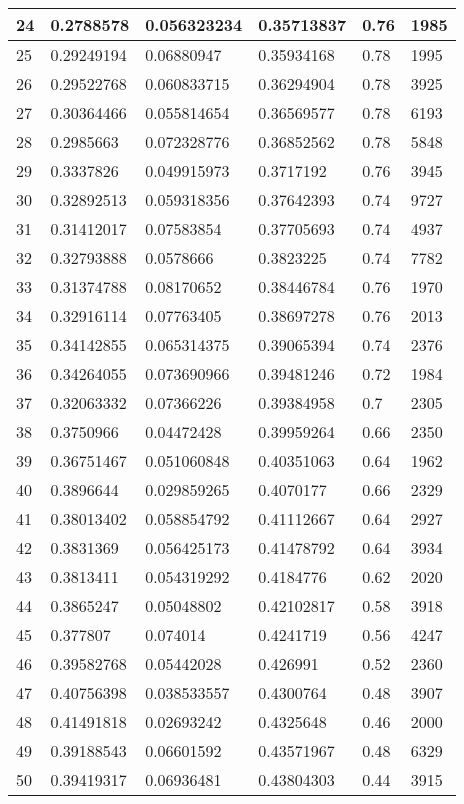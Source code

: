\begin{longtable}{|l|l|l|l|l|l|}
24 & 0.2788578 & 0.056323234 & 0.35713837 & 0.76 & 1985 \\ \hline 
25 & 0.29249194 & 0.06880947 & 0.35934168 & 0.78 & 1995 \\ \hline 
26 & 0.29522768 & 0.060833715 & 0.36294904 & 0.78 & 3925 \\ \hline 
27 & 0.30364466 & 0.055814654 & 0.36569577 & 0.78 & 6193 \\ \hline 
28 & 0.2985663 & 0.072328776 & 0.36852562 & 0.78 & 5848 \\ \hline 
29 & 0.3337826 & 0.049915973 & 0.3717192 & 0.76 & 3945 \\ \hline 
30 & 0.32892513 & 0.059318356 & 0.37642393 & 0.74 & 9727 \\ \hline 
31 & 0.31412017 & 0.07583854 & 0.37705693 & 0.74 & 4937 \\ \hline 
32 & 0.32793888 & 0.0578666 & 0.3823225 & 0.74 & 7782 \\ \hline 
33 & 0.31374788 & 0.08170652 & 0.38446784 & 0.76 & 1970 \\ \hline 
34 & 0.32916114 & 0.07763405 & 0.38697278 & 0.76 & 2013 \\ \hline 
35 & 0.34142855 & 0.065314375 & 0.39065394 & 0.74 & 2376 \\ \hline 
36 & 0.34264055 & 0.073690966 & 0.39481246 & 0.72 & 1984 \\ \hline 
37 & 0.32063332 & 0.07366226 & 0.39384958 & 0.7 & 2305 \\ \hline 
38 & 0.3750966 & 0.04472428 & 0.39959264 & 0.66 & 2350 \\ \hline 
39 & 0.36751467 & 0.051060848 & 0.40351063 & 0.64 & 1962 \\ \hline 
40 & 0.3896644 & 0.029859265 & 0.4070177 & 0.66 & 2329 \\ \hline 
41 & 0.38013402 & 0.058854792 & 0.41112667 & 0.64 & 2927 \\ \hline 
42 & 0.3831369 & 0.056425173 & 0.41478792 & 0.64 & 3934 \\ \hline 
43 & 0.3813411 & 0.054319292 & 0.4184776 & 0.62 & 2020 \\ \hline 
44 & 0.3865247 & 0.05048802 & 0.42102817 & 0.58 & 3918 \\ \hline 
45 & 0.377807 & 0.074014 & 0.4241719 & 0.56 & 4247 \\ \hline 
46 & 0.39582768 & 0.05442028 & 0.426991 & 0.52 & 2360 \\ \hline 
47 & 0.40756398 & 0.038533557 & 0.4300764 & 0.48 & 3907 \\ \hline 
48 & 0.41491818 & 0.02693242 & 0.4325648 & 0.46 & 2000 \\ \hline 
49 & 0.39188543 & 0.06601592 & 0.43571967 & 0.48 & 6329 \\ \hline 
50 & 0.39419317 & 0.06936481 & 0.43804303 & 0.44 & 3915 \\ \hline 
\end{longtable}